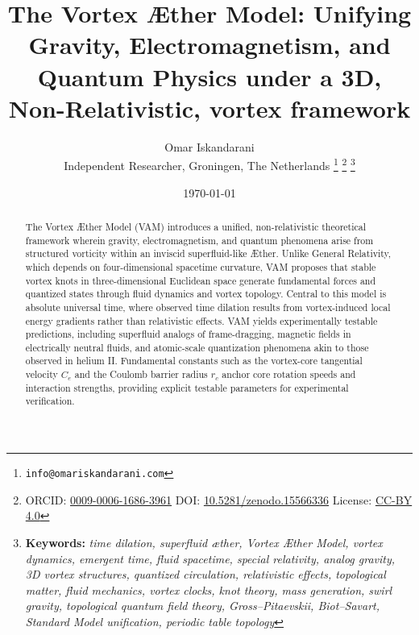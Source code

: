 \documentclass[a4paper,12pt]{article}
\begin{document}
    \title{The Vortex Æther Model: Unifying Gravity, Electromagnetism, and Quantum Physics under a 3D, Non-Relativistic, vortex framework}
    \date{\today}
    \author{
        Omar Iskandarani\\
        \small Independent Researcher, Groningen, The Netherlands
        \thanks{\texttt{info@omariskandarani.com}}
        \thanks{ORCID: \href{https://orcid.org/0009-0006-1686-3961}{0009-0006-1686-3961} \quad DOI: \href{https://doi.org/10.5281/zenodo.15566336}{10.5281/zenodo.15566336} \quad License: \href{https://creativecommons.org/licenses/by/4.0/}{CC-BY 4.0}}
        \noindent\thanks{\textbf{Keywords:} \textit{time dilation, superfluid æther, Vortex Æther Model, vortex dynamics, emergent time, fluid spacetime, special relativity, analog gravity, 3D vortex structures, quantized circulation, relativistic effects, topological matter, fluid mechanics, vortex clocks, knot theory, mass generation, swirl gravity, topological quantum field theory, Gross--Pitaevskii, Biot--Savart, Standard Model unification, periodic table topology}}
    }
    \maketitle
    \begin{abstract}
        The Vortex Æther Model (VAM) introduces a unified, non-relativistic theoretical framework wherein gravity, electromagnetism, and quantum phenomena arise from structured vorticity within an inviscid superfluid-like Æther. Unlike General Relativity, which depends on four-dimensional spacetime curvature, VAM proposes that stable vortex knots in three-dimensional Euclidean space generate fundamental forces and quantized states through fluid dynamics and vortex topology. Central to this model is absolute universal time, where observed time dilation results from vortex-induced local energy gradients rather than relativistic effects. VAM yields experimentally testable predictions, including superfluid analogs of frame-dragging, magnetic fields in electrically neutral fluids, and atomic-scale quantization phenomena akin to those observed in helium II. Fundamental constants such as the vortex-core tangential velocity $C_e$ and the Coulomb barrier radius $r_c$ anchor core rotation speeds and interaction strengths, providing explicit testable parameters for experimental verification.
    \end{abstract}

\newpage
    \tableofcontents
\end{document}
